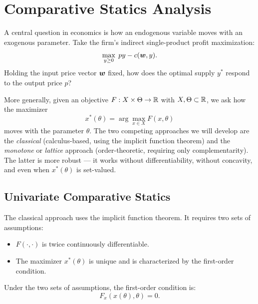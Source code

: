 \chapter{Comparative Statics Analysis}

A central question in economics is how an endogenous variable moves
with an exogenous parameter. Take the firm's indirect single-product
profit maximization:
\[\max _{y\ge0}\;py-c(\bm w,y).\]
Holding the input price vector \(\bm w\) fixed, how does the optimal
supply \(y^*\) respond to the output price \(p\)?

More generally, given an objective \(F: X\times \Theta \to \mathbb R\) with
\(X,\Theta\subset \mathbb R\), we ask how the maximizer
\[x^*(\theta) = \arg\max_{x\in X}F(x,\theta)\]
moves with the parameter \(\theta\). The two competing approaches we
will develop are the \emph{classical} (calculus-based, using the
implicit function theorem) and the \emph{monotone} or \emph{lattice}
approach (order-theoretic, requiring only complementarity). The latter
is more robust — it works without differentiability, without
concavity, and even when \(x^*(\theta)\) is set-valued.

\section{Univariate Comparative Statics}\label{univariate-comparative-statics}

The classical approach uses the implicit function theorem. It requires
two sets of assumptions:

\begin{itemize}
\item
  \(F(\cdot,\cdot )\) is twice continuously differentiable.
\item
  The maximizer \(x^*(\theta)\) is unique and is characterized by the
  first-order condition.
\end{itemize}


Under the two sets of assumptions, the first-order condition is:
\[F_x(x(\theta),\theta) = 0.\]

